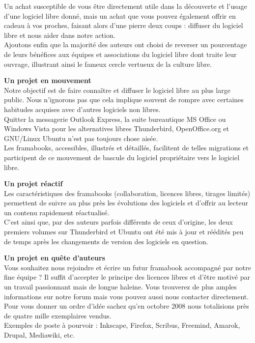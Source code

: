 {Un achat susceptible de vous être directement utile dans la découverte et l'usage d'une logiciel libre donné, mais un achat que vous pouvez également offrir en cadeau à vos proches, faisant alors d'une pierre deux coups : diffuser du logiciel libre et nous aider dans notre action.\\
Ajoutons enfin que la majorité des auteurs ont choisi de reverser un pourcentage de leurs bénéfices aux équipes et associations du logiciel libre dont traite leur ouvrage, illustrant ainsi le fameux cercle vertueux de la culture libre.\par
\textbf{Un projet en mouvement}\\
Notre objectif est de faire connaître et diffuser le logiciel libre au plus large public. Nous n'ignorons pas que cela implique souvent de rompre avec certaines habitudes acquises avec d'autres logiciels non libres.\\
Quitter la messagerie Outlook Express, la suite bureautique MS Office ou Windows Vista pour les alternatives libres Thunderbird, OpenOffice.org et GNU/Linux Ubuntu n'est pas toujours chose aisée.\\
Les framabooks, accessibles, illustrés et détaillés, facilitent de telles migrations et participent de ce mouvement de bascule du logiciel propriétaire vers le logiciel libre.\par
\textbf{Un projet réactif}\\
Les caractéristiques des framabooks (collaboration, licences libres, tirages limités) permettent de suivre au plus près les évolutions des logiciels et d'offrir au lecteur un contenu rapidement réactualisé.\\
C'est ainsi que, par des auteurs parfois différents de ceux d'origine, les deux premiers volumes sur Thunderbird et Ubuntu ont été mis à jour et réédités peu de temps après les changements de version des logiciels en question.\par
\textbf{Un projet en quête d'auteurs}\\
Vous souhaitez nous rejoindre et écrire un futur framabook accompagné par notre fine équipe ? Il suffit d'accepter le principe des licences libres et d'être motivé par un travail passionnant mais de longue haleine. Vous trouverez de plus amples informations sur notre forum mais vous pouvez aussi nous contacter directement.\\
Pour vous donner un ordre d'idée sachez qu'en octobre 2008 nous totalisions près de quatre mille exemplaires vendus.\\
Exemples de poste à pourvoir : Inkscape, Firefox, Scribus, Freemind, Amarok, Drupal, Mediawiki, etc.\par
}
